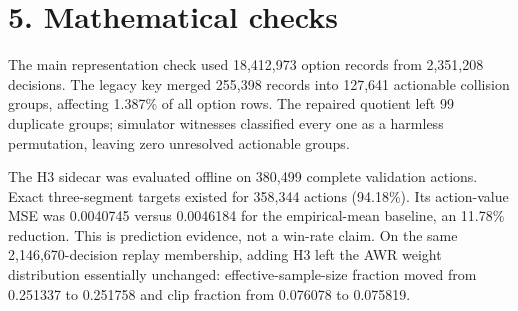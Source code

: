 \section*{5. Mathematical checks}

The main representation check used 18,412,973 option records from 2,351,208
decisions. The legacy key merged 255,398 records into 127,641 actionable
collision groups, affecting 1.387\% of all option rows. The repaired quotient
left 99 duplicate groups; simulator witnesses classified every one as a
harmless permutation, leaving zero unresolved actionable groups.

The H3 sidecar was evaluated offline on 380,499 complete validation actions.
Exact three-segment targets existed for 358,344 actions (94.18\%). Its
action-value MSE was 0.0040745 versus 0.0046184 for the empirical-mean
baseline, an 11.78\% reduction. This is prediction evidence, not a win-rate
claim. On the same 2,146,670-decision replay membership, adding H3 left the AWR
weight distribution essentially unchanged: effective-sample-size fraction
moved from 0.251337 to 0.251758 and clip fraction from 0.076078 to 0.075819.
